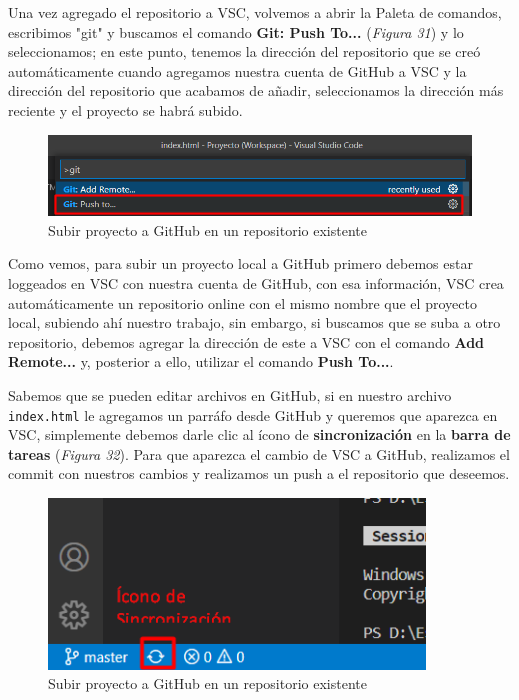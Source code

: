 Una vez agregado el repositorio a VSC, volvemos a abrir la Paleta de comandos, escribimos "git" y buscamos el comando \textbf{Git: Push To...} (\textit{Figura 31}) y lo seleccionamos; en este punto, tenemos la dirección del repositorio que se creó automáticamente cuando agregamos nuestra cuenta de GitHub a VSC y la dirección del repositorio que acabamos de añadir, seleccionamos la dirección más reciente y el proyecto se habrá subido.
\begin{figure}[H]
    \begin{center}
        \caption{Subir proyecto a GitHub en un repositorio existente}
        \label{fig: 31}
        \includegraphics[width=14cm]{capturas/subir_proyecto5.png}
    \end{center}
\end{figure}

Como vemos, para subir un proyecto local a GitHub primero debemos estar loggeados en VSC con nuestra cuenta de GitHub, con esa información, VSC crea automáticamente un repositorio online con el mismo nombre que el proyecto local, subiendo ahí nuestro trabajo, sin embargo, si buscamos que se suba a otro repositorio, debemos agregar la dirección de este a VSC con el comando \textbf{Add Remote...} y, posterior a ello, utilizar el comando \textbf{Push To...}.

Sabemos que se pueden editar archivos en GitHub, si en nuestro archivo \texttt{index.html} le agregamos un parráfo desde GitHub y queremos que aparezca en VSC, simplemente debemos darle clic al ícono de \textbf{sincronización} en la \textbf{barra de tareas} (\textit{Figura 32}). Para que aparezca el cambio de VSC a GitHub, realizamos el commit con nuestros cambios y realizamos un push a el repositorio que deseemos.
\begin{figure}[H]
    \begin{center}
        \caption{Subir proyecto a GitHub en un repositorio existente}
        \label{fig: 32}
        \includegraphics[width=10cm]{capturas/sincronizacion.png}
    \end{center}
\end{figure}

